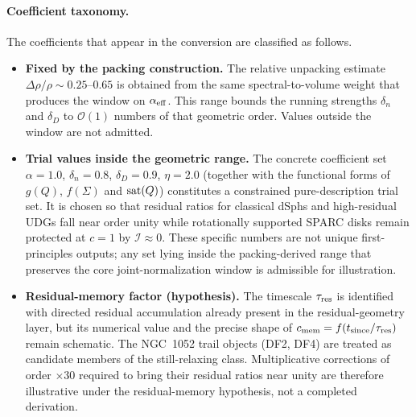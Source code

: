 \documentclass[11pt,a4paper]{article}
\begin{document}
\paragraph{Coefficient taxonomy.}
The coefficients that appear in the conversion are classified as follows.
\begin{itemize}[leftmargin=*]
\item \textbf{Fixed by the packing construction.} The relative unpacking estimate \(\Delta\rho/\rho\sim0.25\)--\(0.65\) is obtained from the same spectral-to-volume weight that produces the window on \(\alpha_{\rm eff}\). This range bounds the running strengths \(\delta_n\) and \(\delta_D\) to \(\mathcal{O}(1)\) numbers of that geometric order. Values outside the window are not admitted.
\item \textbf{Trial values inside the geometric range.} The concrete coefficient set \(\alpha=1.0\), \(\delta_n=0.8\), \(\delta_D=0.9\), \(\eta=2.0\) (together with the functional forms of \(g(Q)\), \(f(\Sigma)\) and \({\rm sat}(Q)\)) constitutes a constrained pure-description trial set. It is chosen so that residual ratios for classical dSphs and high-residual UDGs fall near order unity while rotationally supported SPARC disks remain protected at \(c=1\) by \(\mathcal{I}\approx0\). These specific numbers are not unique first-principles outputs; any set lying inside the packing-derived range that preserves the core joint-normalization window is admissible for illustration.
\item \textbf{Residual-memory factor (hypothesis).} The timescale \(\tau_{\rm res}\) is identified with directed residual accumulation already present in the residual-geometry layer, but its numerical value and the precise shape of \(c_{\rm mem}=f(t_{\rm since}/\tau_{\rm res})\) remain schematic. The NGC~1052 trail objects (DF2, DF4) are treated as candidate members of the still-relaxing class. Multiplicative corrections of order \(\times30\) required to bring their residual ratios near unity are therefore illustrative under the residual-memory hypothesis, not a completed derivation.
\end{itemize}
\end{document}
